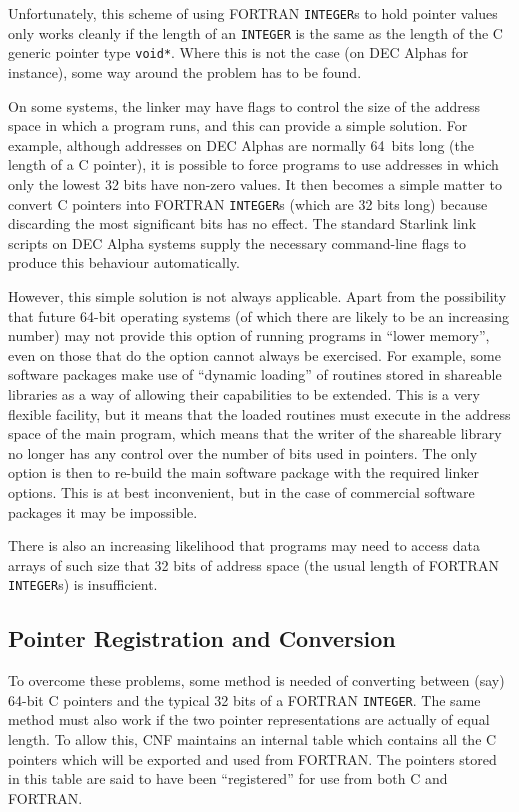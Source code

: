 \documentclass[twoside,11pt]{article}
\newcommand{\xlabel}[1]{}
\renewcommand{\_}{\texttt{\symbol{95}}}
\begin{document}
Unfortunately, this scheme of using FORTRAN \texttt{INTEGER}s to hold
pointer values only works cleanly if the length of an \texttt{INTEGER}
is the same as the length of the C generic pointer type
\texttt{void*}.  Where this is not the case (on DEC Alphas for
instance), some way around the problem has to be found.

On some systems, the linker may have flags to control the size of the
address space in which a program runs, and this can provide a simple
solution. For example, although addresses on DEC Alphas are normally
64~bits long (the length of a C pointer), it is possible to force
programs to use addresses in which only the lowest 32 bits have
non-zero values. It then becomes a simple matter to convert C pointers
into FORTRAN \texttt{INTEGER}s (which are 32 bits long) because
discarding the most significant bits has no effect. The standard
Starlink link scripts on DEC Alpha systems supply the necessary
command-line flags to produce this behaviour automatically.

However, this simple solution is not always applicable. Apart from the
possibility that future 64-bit operating systems (of which there are
likely to be an increasing number) may not provide this option of
running programs in ``lower memory'', even on those that do the option
cannot always be exercised. For example, some software packages make
use of ``dynamic loading'' of routines stored in shareable libraries
as a way of allowing their capabilities to be extended. This is a very
flexible facility, but it means that the loaded routines must execute
in the address space of the main program, which means that the writer
of the shareable library no longer has any control over the number of
bits used in pointers. The only option is then to re-build the main
software package with the required linker options. This is at best
inconvenient, but in the case of commercial software packages it may
be impossible.

There is also an increasing likelihood that programs may need to
access data arrays of such size that 32 bits of address space (the
usual length of FORTRAN \texttt{INTEGER}s) is insufficient.

\subsection{\xlabel{pointer_registration_and_conversion}Pointer
Registration and Conversion}

To overcome these problems, some method is needed of converting
between (say) 64-bit C pointers and the typical 32 bits of a FORTRAN
\texttt{INTEGER}. The same method must also work if the two pointer
representations are actually of equal length.  To allow this, CNF
maintains an internal table which contains all the C pointers which
will be exported and used from FORTRAN. The pointers stored in this
table are said to have been ``registered'' for use from both C and
FORTRAN.
\end{document}
